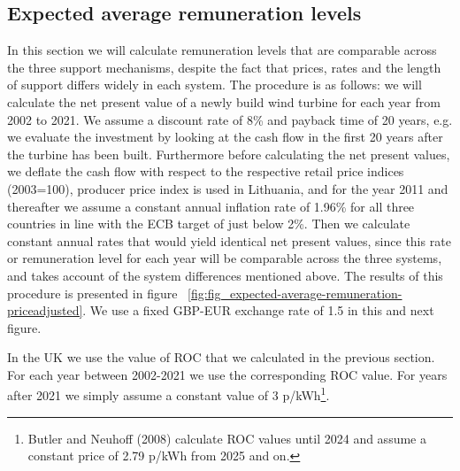 \documentclass[a4paper, 12pt]{article}
\begin{document}
\subsection{Expected average remuneration levels}

In this section we will calculate remuneration levels that are comparable across the three support mechanisms, despite the fact that prices, rates and the length of support differs widely in each system. The procedure is as follows: we will calculate the net present value of a newly build wind turbine for each year from 2002 to 2021. We assume a discount rate of 8\% and payback time of 20 years, e.g. we evaluate the investment by looking at the cash flow in the first 20 years after the turbine has been built. Furthermore before calculating the net present values, we deflate the cash flow with respect to the respective retail price indices (2003=100), producer price index is used in Lithuania, and for the year 2011 and thereafter we assume a constant annual inflation rate of 1.96\% for all three countries in line with the ECB target of just below 2\%. Then we calculate constant annual rates that would yield identical net present values, since this rate or remuneration level for each year will be comparable across the three systems, and takes account of the system differences mentioned above. The results of this procedure is presented in figure ~\ref{fig:fig_expected-average-remuneration-priceadjusted}. We use a fixed GBP-EUR exchange rate of 1.5 in this and next figure.

In the UK we use the value of ROC that we calculated in the previous section. For each year between 2002-2021 we use the corresponding ROC value. For years after 2021 we simply assume a constant value of 3 p/kWh\footnote{Butler and Neuhoff (2008) calculate ROC values until 2024 and assume a constant price of 2.79 p/kWh from 2025 and on.}.
\end{document}
